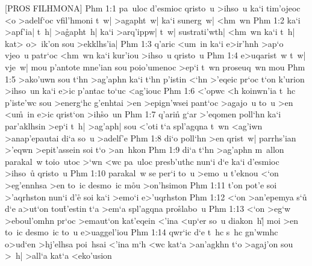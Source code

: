 [PROS FILHMONA]
\vs Phm 1:1
pa~uloc
d'esmioc
qristo~u
>ihso~u
ka`i
tim'ojeoc
<o
>adelf`oc
vfil'hmoni
t~w|
>agapht~w|
ka`i
sunerg~w|
<hm~wn\bibvsend
\vs Phm 1:2
ka`i
>apf'ia|
t~h|
>a\r{g}a\-ph\-t~h|
ka`i
>arq'ippw|
t~w|
sustrati'wth|
<hm~wn
ka`i
t~h|
kat>
o>~ik'on
sou
>ekklhs'ia|\bibvsend
\vs Phm 1:3
q'aric
<um~in
ka`i
e>ir'hnh
>ap`o
vjeo~u
patr`oc
<hm~wn
ka`i
kur'iou
>ihso~u
qristo~u\bibvsend
\vs Phm 1:4
e>uqarist~w
t~w|
vje~w|
mou
p'antote
mne'ian
sou
poio'umenoc
>ep`i
t~wn
proseuq~wn
mou\bibvsend
\vs Phm 1:5
>ako'uwn
sou
t`hn
>ag'aphn
ka`i
t`hn
p'istin
<`hn
>'eqeic
pr`oc
t`on
k'urion
>ihso~un
ka`i
e>ic
p'antac
to`uc
<ag'iouc\bibvsend
\vs Phm 1:6
<'opwc
<h
koinwn'ia
t~hc
p'iste'wc
sou
>energ`hc
g'enhtai
>en
>epign'wsei
pant`oc
>agajo~u
to~u
>en
<u\r{m}~in
e>ic
qrist`on
>ih\r{s}o~un\bibvsend
{}
\vs Phm 1:7
q'arin\r{}
g`ar
>'eqomen
poll`hn
ka`i
par'aklhsin
>ep`i
t~h|
>ag'aph|
sou
<'oti
t`a
spl'agqna
t~wn
<ag'iwn
>anap'epautai
di`a
so~u
>adelf'e\bibvsend
\vs Phm 1:8
di`o
poll`hn
>en
qrist~w|
parrhs'ian
>'eqwn
>epit'assein
soi
t`o
>an~hkon\bibvsend
\vs Phm 1:9
di`a
t`hn
>ag'aphn
m~allon
parakal~w
toio~utoc
>`wn
<wc
pa~uloc
presb'uthc
nun`i
d`e
ka`i
d'esmioc
>ihso~u\r{}
qristo~u\bibvsend
\vs Phm 1:10
parakal~w
se
per`i
to~u
>emo~u
t'eknou
<`on
>eg'ennhsa
>en
to~ic
desmo~ic
m\r{o}u
>on'hsimon\bibvsend
\vs Phm 1:11
t'on
pot'e
soi
>'aqrhston
nun`i
d'e\r{}
soi
ka`i
>emo`i
e>'uqrhston\bibvsend
\vs Phm 1:12
<`on
>an'epemya
s`u\r{}
d`e
a>ut`on
tou\r{t}'estin
t`a
>em`a
spl'agqna
pro\r{s}labo~u\bibvsend
{}
\vs Phm 1:13
<`on
>eg`w
>eboul'omhn
pr`oc
>emaut`on
kat'eqein
<'ina
<up`er
so~u
diakon~h|\r{}
moi
>en
to~ic
desmo~ic
to~u
e>uaggel'iou\bibvsend
\vs Phm 1:14
qwr`ic
d`e
t~hc
s~hc
gn'wmhc
o>ud`en
>hj'elhsa
poi~hsai
<'ina
m`h
<wc
kat`a
>an'agkhn
t`o
>agaj'on
sou
>~h|
>all`a
kat`a
<eko'usion\bibvsend
